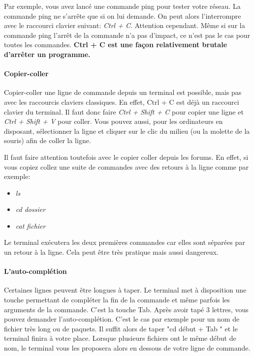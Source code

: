 Par exemple, vous avez lancé une commande ping pour tester votre réseau. La
commande ping ne s'arrête que si on lui demande. On peut alors l'interrompre
avec le raccourci clavier suivant: \textit{Ctrl + C}. Attention cependant. Même
si sur la commande ping l'arrêt de la commande n'a pas d'impact, ce n'est pas
le cas pour toutes les commandes. \textbf{Ctrl + C est une façon relativement
brutale d'arrêter un programme.}

\paragraph{Copier-coller} Copier-coller une ligne de commande depuis un
terminal est possible, mais pas avec les raccourcis claviers classiques. En
effet, Ctrl + C est déjà un raccourci clavier du terminal. Il faut donc faire
\textit{Ctrl + Shift + C} pour copier une ligne et \textit{Ctrl + Shift + V}
pour coller. Vous pouvez aussi, pour les ordinateurs en disposant, sélectionner
la ligne et cliquer sur le clic du milieu (ou la molette de la souris) afin de
coller la ligne.

Il faut faire attention toutefois avec le copier coller depuis les forums. En
effet, si vous copiez collez une suite de commandes avec des retours à la ligne
comme par exemple:

\begin{itemize}
	\item \textit{ls}
	\item \textit{cd dossier}
	\item \textit{cat fichier}
\end{itemize}

Le terminal exécutera les deux premières commandes car elles sont séparées par
un retour à la ligne. Cela peut être très pratique mais aussi dangereux.

\paragraph{L'auto-complétion}

Certaines lignes peuvent être longues à taper. Le terminal met à disposition une
touche permettant de compléter la fin de la commande et même parfois les
arguments de la commande. C'est la touche Tab. Après avoir tapé 3 lettres, vous
pouvez demander l'auto-complétion. C'est le cas par exemple pour un nom de
fichier très long ou de paquets. Il suffit alors de taper "cd début + Tab " et
le terminal finira à votre place. Lorsque plusieurs fichiers ont le même début
de nom, le terminal vous les proposera alors en dessous de votre ligne de
commande.

